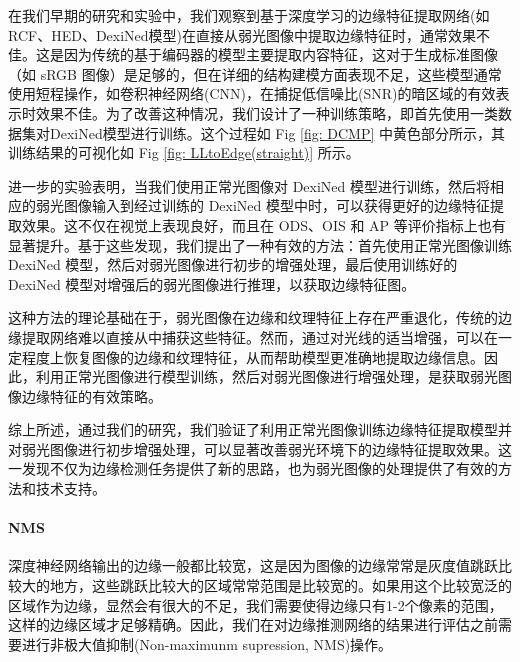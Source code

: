 \documentclass[a4paper]{ctexart}
\begin{document}
		在我们早期的研究和实验中，我们观察到基于深度学习的边缘特征提取网络(如RCF、HED、DexiNed模型)在直接从弱光图像中提取边缘特征时，通常效果不佳。这是因为传统的基于编码器的模型主要提取内容特征，这对于生成标准图像（如 sRGB 图像）是足够的，但在详细的结构建模方面表现不足，这些模型通常使用短程操作，如卷积神经网络(CNN)，在捕捉低信噪比(SNR)的暗区域的有效表示时效果不佳。为了改善这种情况，我们设计了一种训练策略，即首先使用一类数据集对DexiNed模型进行训练。这个过程如 Fig \ref{fig: DCMP} 中黄色部分所示，其训练结果的可视化如 Fig \ref{fig: LLtoEdge(straight)} 所示。
		
		进一步的实验表明，当我们使用正常光图像对 DexiNed 模型进行训练，然后将相应的弱光图像输入到经过训练的 DexiNed 模型中时，可以获得更好的边缘特征提取效果。这不仅在视觉上表现良好，而且在 ODS、OIS 和 AP 等评价指标上也有显著提升。基于这些发现，我们提出了一种有效的方法：首先使用正常光图像训练 DexiNed 模型，然后对弱光图像进行初步的增强处理，最后使用训练好的 DexiNed 模型对增强后的弱光图像进行推理，以获取边缘特征图。
		
		这种方法的理论基础在于，弱光图像在边缘和纹理特征上存在严重退化，传统的边缘提取网络难以直接从中捕获这些特征。然而，通过对光线的适当增强，可以在一定程度上恢复图像的边缘和纹理特征，从而帮助模型更准确地提取边缘信息。因此，利用正常光图像进行模型训练，然后对弱光图像进行增强处理，是获取弱光图像边缘特征的有效策略。
		
		综上所述，通过我们的研究，我们验证了利用正常光图像训练边缘特征提取模型并对弱光图像进行初步增强处理，可以显著改善弱光环境下的边缘特征提取效果。这一发现不仅为边缘检测任务提供了新的思路，也为弱光图像的处理提供了有效的方法和技术支持。
		
		\paragraph{NMS}
		
		深度神经网络输出的边缘一般都比较宽，这是因为图像的边缘常常是灰度值跳跃比较大的地方，这些跳跃比较大的区域常常范围是比较宽的。如果用这个比较宽泛的区域作为边缘，显然会有很大的不足，我们需要使得边缘只有1-2个像素的范围，这样的边缘区域才足够精确。因此，我们在对边缘推测网络的结果进行评估之前需要进行非极大值抑制(Non-maximunm supression, NMS)操作。
		
		
\end{document}
